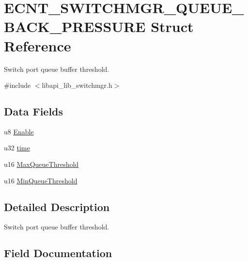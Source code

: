 \hypertarget{structECNT__SWITCHMGR__QUEUE__BACK__PRESSURE}{}\section{E\+C\+N\+T\+\_\+\+S\+W\+I\+T\+C\+H\+M\+G\+R\+\_\+\+Q\+U\+E\+U\+E\+\_\+\+B\+A\+C\+K\+\_\+\+P\+R\+E\+S\+S\+U\+RE Struct Reference}
\label{structECNT__SWITCHMGR__QUEUE__BACK__PRESSURE}


Switch port queue buffer threshold.  




{\ttfamily \#include $<$libapi\+\_\+lib\+\_\+switchmgr.\+h$>$}

\subsection*{Data Fields}
\begin{DoxyCompactItemize}
\item 
u8 \hyperlink{structECNT__SWITCHMGR__QUEUE__BACK__PRESSURE_aa8df81641b29d7711ecce6b57928555e}{Enable}
\item 
u32 \hyperlink{structECNT__SWITCHMGR__QUEUE__BACK__PRESSURE_a4f027c2b029f00e2e5669832665d2848}{time}
\item 
u16 \hyperlink{structECNT__SWITCHMGR__QUEUE__BACK__PRESSURE_ad34c2f33b9b11df91f8380a63791b368}{Max\+Queue\+Threshold}
\item 
u16 \hyperlink{structECNT__SWITCHMGR__QUEUE__BACK__PRESSURE_a398f586566cd7bab36017f11c0912b47}{Min\+Queue\+Threshold}
\end{DoxyCompactItemize}


\subsection{Detailed Description}
Switch port queue buffer threshold. 

\subsection{Field Documentation}
\mbox{\label{structECNT__SWITCHMGR__QUEUE__BACK__PRESSURE_aa8df81641b29d7711ecce6b57928555e}} 
